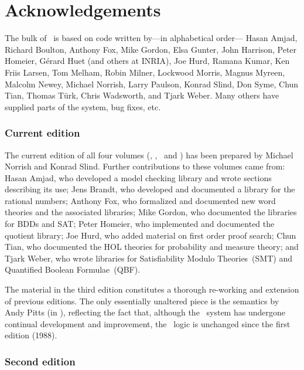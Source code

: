 \chapter*{Acknowledgements}

The bulk of \HOL\ is based on code written by---in alphabetical
order---%
Hasan Amjad,
Richard Boulton,
Anthony Fox,
Mike Gordon,
Elsa Gunter,
John Harrison,
Peter Homeier,
G\'erard Huet (and others at INRIA),
Joe Hurd,
Ramana Kumar,
Ken Friis Larsen,
Tom Melham,
Robin Milner,
Lockwood Morris,
Magnus Myreen,
Malcolm Newey,
Michael Norrish,
Larry Paulson,
Konrad Slind,
Don Syme,
Chun Tian,
Thomas T\"urk,
Chris Wadsworth,
and
Tjark Weber.
Many others have supplied parts of the system, bug fixes, etc.

\subsection*{Current edition}

The current edition of all four volumes (\LOGIC, \TUTORIAL,
\DESCRIPTION\ and \REFERENCE) has been prepared by Michael Norrish and
Konrad Slind. Further contributions to these volumes came from: Hasan
Amjad, who developed a model checking library and wrote sections
describing its use; Jens Brandt, who developed and documented a
library for the rational numbers; Anthony Fox, who formalized and
documented new word theories and the associated libraries; Mike
Gordon, who documented the libraries for BDDs and SAT; Peter Homeier,
who implemented and documented the quotient library; Joe Hurd, who
added material on first order proof search; Chun Tian, who documented the HOL theories for probability and measure theory; and Tjark Weber, who wrote
libraries for Satisfiability Modulo Theories~(SMT) and Quantified
Boolean Formulae~(QBF).

\medskip

The material in the third edition constitutes a thorough re-working
and extension of previous editions.  The only essentially unaltered
piece is the semantics by Andy Pitts (in \LOGIC), reflecting the fact
that, although the \HOL\ system has undergone continual development
and improvement, the \HOL\ logic is unchanged since the first edition
(1988).

\newpage

\subsection*{Second edition}


